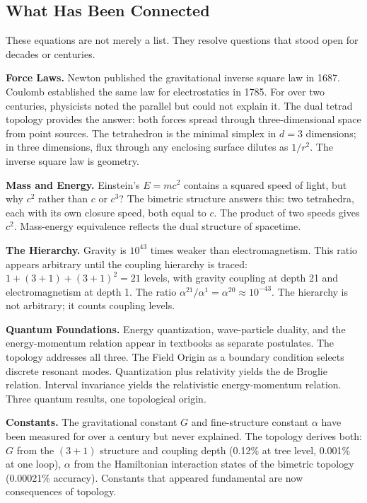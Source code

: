 \documentclass[aps,prd,preprint,superscriptaddress,showpacs,preprintnumbers,amsmath,amssymb,nofootinbib]{revtex4-2}
\begin{document}
\subsection{What Has Been Connected}
\label{subsec:connections}

These equations are not merely a list. They resolve questions that stood open for decades or centuries.

\textbf{Force Laws.} Newton published the gravitational inverse square law in 1687. Coulomb established the same law for electrostatics in 1785. For over two centuries, physicists noted the parallel but could not explain it. The dual tetrad topology provides the answer: both forces spread through three-dimensional space from point sources. The tetrahedron is the minimal simplex in $d = 3$ dimensions; in three dimensions, flux through any enclosing surface dilutes as $1/r^2$. The inverse square law is geometry.

\textbf{Mass and Energy.} Einstein's $E = mc^2$ contains a squared speed of light, but why $c^2$ rather than $c$ or $c^3$? The bimetric structure answers this: two tetrahedra, each with its own closure speed, both equal to $c$. The product of two speeds gives $c^2$. Mass-energy equivalence reflects the dual structure of spacetime.

\textbf{The Hierarchy.} Gravity is $10^{43}$ times weaker than electromagnetism. This ratio appears arbitrary until the coupling hierarchy is traced: $1 + (3+1) + (3+1)^2 = 21$ levels, with gravity coupling at depth 21 and electromagnetism at depth 1. The ratio $\alpha^{21}/\alpha^{1} = \alpha^{20} \approx 10^{-43}$. The hierarchy is not arbitrary; it counts coupling levels.

\textbf{Quantum Foundations.} Energy quantization, wave-particle duality, and the energy-momentum relation appear in textbooks as separate postulates. The topology addresses all three. The Field Origin as a boundary condition selects discrete resonant modes. Quantization plus relativity yields the de Broglie relation. Interval invariance yields the relativistic energy-momentum relation. Three quantum results, one topological origin.

\textbf{Constants.} The gravitational constant $G$ and fine-structure constant $\alpha$ have been measured for over a century but never explained. The topology derives both: $G$ from the $(3+1)$ structure and coupling depth (0.12\% at tree level, 0.001\% at one loop), $\alpha$ from the Hamiltonian interaction states of the bimetric topology (0.00021\% accuracy). Constants that appeared fundamental are now consequences of topology.
\end{document}
